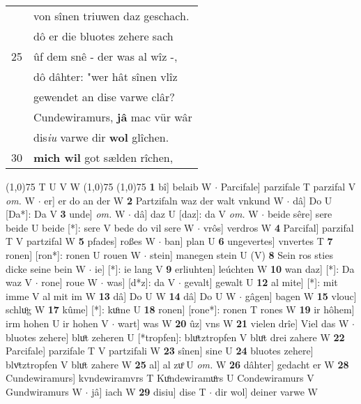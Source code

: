 \documentclass[8pt,a4paper,notitlepage]{article}
\begin{document}
\begin{table}[ht]
\begin{minipage}[t]{0.5\linewidth}
\begin{tabular}{rl}
 & von sînen triuwen daz geschach.\\ 
 & dô er die bluotes zehere sach\\ 
25 & ûf dem snê - der was al wîz -,\\ 
 & dô dâhter: "wer hât sînen vlîz\\ 
 & gewendet an dise varwe clâr?\\ 
 & Cundewiramurs, \textbf{jâ} mac vür wâr\\ 
 & dis\textit{iu} varwe dir \textbf{wol} glîchen.\\ 
30 & \textbf{mich wil} got sælden rîchen,\\ 
\end{tabular}
\scriptsize
\line(1,0){75} \newline
T U V W \newline
\line(1,0){75} \newline
\newline
\line(1,0){75} \newline
\textbf{1} bî] belaib W  $\cdot$ Parcifale] parzifale T parzifal V \textit{om.} W  $\cdot$ er] er do an der W \textbf{2} Partzifaln waz der walt vnkund W  $\cdot$ dâ] Do U [Da*]: Da V \textbf{3} unde] \textit{om.} W  $\cdot$ dâ] daz U [daz]: da V \textit{om.} W  $\cdot$ beide sêre] sere beide U beide [*]: sere V bede do vil sere W  $\cdot$ vrôs] verdros W \textbf{4} Parcifal] parzifal T V partzifal W \textbf{5} pfades] roßes W  $\cdot$ ban] plan U \textbf{6} ungevertes] vnvertes T \textbf{7} ronen] [ron*]: ronen U rouen W  $\cdot$ stein] manegen stein U (V) \textbf{8} Sein ros sties dicke seine bein W  $\cdot$ ie] [*]: ie lang V \textbf{9} erliuhten] leúchten W \textbf{10} wan daz] [*]: Da waz V  $\cdot$ rone] roue W  $\cdot$ was] [d*z]: da V  $\cdot$ gevalt] gewalt U \textbf{12} al mite] [*]: mit imme V al mit im W \textbf{13} dâ] Do U W \textbf{14} dâ] Do U W  $\cdot$ gâgen] bagen W \textbf{15} vlouc] schluͦg W \textbf{17} kûme] [*]: kuͦme U \textbf{18} ronen] [rone*]: ronen T rones W \textbf{19} ir hôhem] irm hohen U ir hohen V  $\cdot$ wart] was W \textbf{20} ûz] vns W \textbf{21} vielen drîe] Viel das W  $\cdot$ bluotes zehere] bluͦt zeheren U [*tropfen]: bluͦtztropfen V bluͦt drei zahere W \textbf{22} Parcifale] parzifale T V partzifali W \textbf{23} sînen] sine U \textbf{24} bluotes zehere] blvͦtztropfen V bluͦt zahere W \textbf{25} al] al zuͦ U \textit{om.} W \textbf{26} dâhter] gedacht er W \textbf{28} Cundewiramurs] kvndewiramvrs T Kuͦndewiramuͦrs U Condewiramurs V Gundwiramurs W  $\cdot$ jâ] iach W \textbf{29} disiu] dise T  $\cdot$ dir wol] deiner varwe W \newline
\end{minipage}
\end{table}
\end{document}
